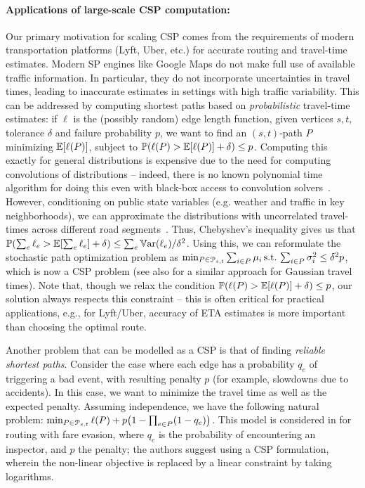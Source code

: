 \paragraph{Applications of large-scale CSP computation:}
Our primary motivation for scaling CSP comes from the requirements of modern transportation platforms (Lyft, Uber, etc.) for accurate routing and travel-time estimates.
Modern SP engines like Google Maps do not make full use of available traffic information.
In particular, they do not incorporate uncertainties in travel times, leading to inaccurate estimates in settings with high traffic variability.
This can be addressed by computing shortest paths based on \emph{probabilistic} travel-time estimates:
if $\ell$ is the (possibly random) edge length function, given vertices $s,t$, tolerance $\delta$ and failure probability $p$, we want to find an $(s,t)$-path $P$ minimizing $\mathbb{E}[\ell(P)]$, subject to $\mathbb{P}(\ell(P)>\mathbb{E}[\ell(P)]+\delta)\leq p$.
Computing this exactly for general distributions is expensive due to the need for computing convolutions of distributions -- indeed, there is no known polynomial time algorithm for doing this even with black-box access to convolution solvers~\citep{nikolova_gaussian}. 
However, conditioning on public state variables (e.g. weather and traffic in key neighborhoods),  we can approximate the distributions with uncorrelated travel-times across different road segments~\citep{woodard2017predicting}. 
Thus, Chebyshev's inequality gives us that $\mathbb{P}(\sum_e\ell_e>\mathbb{E}[\sum_e\ell_e]+\delta)\leq \sum_e\mathbb{V}\textnormal{ar}(\ell_e)/\delta^2$. 
Using this, we can reformulate the stochastic path optimization problem as 
$\min_{ P\in\mathcal{P}_{s,t}}\sum_{i\in P}\mu_i \, \mbox{s.t.}\, \sum_{i\in P}\sigma^2_i\leq \delta^2p$, which is now a CSP problem (see also \citep{nikolova_gaussian} for a similar approach for Gaussian travel times). 
Note that, though we relax the condition $\mathbb{P}(\ell(P)>\mathbb{E}[\ell(P)]+\delta)\leq p$, our solution always respects this constraint -- this is often critical for practical applications, e.g., for Lyft/Uber, accuracy of ETA estimates is more important than choosing the optimal route.

Another problem that can be modelled as a CSP is that of finding \emph{reliable shortest paths}.
Consider the case where each edge has a probability $q_e$ of triggering a bad event, with resulting penalty $p$ (for example, slowdowns due to accidents).
In this case, we want to minimize the travel time as well as the expected penalty.
Assuming independence, we have the following natural problem:
$\min_{P\in\Pst} \ell(P)+p\prn*{1-\prod_{e\in P}(1-q_e)}$.
This model is considered in \citep{fareevasion} for routing with fare evasion, where $q_e$ is the probability of encountering an inspector, and $p$ the penalty; the authors suggest using a CSP formulation, wherein the non-linear objective is replaced by a linear constraint by taking logarithms.


